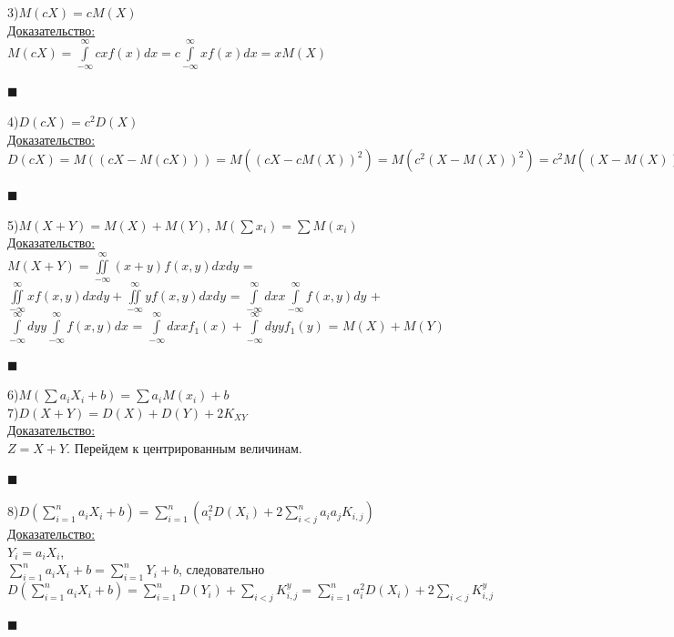 \documentclass[russian, 12pt, fleqn]{article}
\begin{document}
3)$M(cX) = cM(X)$\\
\underline{Доказательство:}\\
$M(cX) = \displaystyle{\int\limits_{-\infty} ^{\infty}} c x f(x) dx = c \displaystyle{\int \limits_{-\infty} ^{\infty}} x f(x) dx = xM(X)$\\
\begin{flushright}\(\blacksquare\)\end{flushright}
4)$D(cX) = c^2 D(X)$\\
\underline{Доказательство:}\\
$D(cX)=M((cX - M(cX))) = M((cX - c M(X))^2) = M(c^2(X-M(X))^2) = c^2M((X-M(X))^2) = c^2 D(X)$\\
\begin{flushright}\(\blacksquare\)\end{flushright}
5)$M(X+Y) = M(X) + M(Y)$,  $M(\sum x_i) = \sum M(x_i)$\\
\underline{Доказательство:}\\
$M(X + Y) =  \displaystyle{\iint \limits_{-\infty} ^{\infty}} (x+y)f(x,y) dxdy$ = $\displaystyle{\iint \limits_{-\infty} ^{\infty}} xf(x,y) dxdy + \displaystyle{\iint \limits_{-\infty} ^{\infty}} yf(x,y) dxdy$ = $\displaystyle{\int\limits_{-\infty}^{\infty} } dx x \displaystyle{\int\limits_{-\infty}^{\infty} } f(x, y) dy $ +  $\displaystyle{\int\limits_{-\infty}^{\infty} } dy y \displaystyle{\int\limits_{-\infty}^{\infty} } f(x, y) dx $ = $\displaystyle{\int\limits_{-\infty}^{\infty} } dx x f_1(x) + \displaystyle{\int\limits_{-\infty}^{\infty} } dyy f_1(y)$ = $M(X) + M(Y)$\\
\begin{flushright}\(\blacksquare\)\end{flushright}
6)$M(\sum \limits a_i X_i + b) = \sum \limits a_i M(x_i) + b$\\
7)$D(X + Y) = D(X) + D(Y) + 2 K_{XY}$\\
\underline{Доказательство:}\\
$Z=X+Y$. Перейдем к центрированным величинам.\\
\begin{flushright}\(\blacksquare\)\end{flushright}
8)$D(\displaystyle{\sum_{i = 1}^{n}}a_iX_i + b) =  \displaystyle{\sum_{i = 1}^{n}} ( a_i^2 D(X_i) + 2 \displaystyle{\sum_{i <j}^{n}}a_ia_jK_{i,j})$\\
\underline{Доказательство:}\\
$Y_i = a_i X_i$,\\
 $ \displaystyle{\sum_{i = 1}^{n}}a_iX_i + b =  \displaystyle{\sum_{i = 1}^{n}}Y_i + b$, следовательно  $D(  \displaystyle{\sum_{i = 1}^{n}} a_iX_i  +  b  ) = \displaystyle{\sum_{i = 1}^{n}} D(Y_i) + \displaystyle{\sum_{i < j}^{}} K_{i,j} ^y = \displaystyle{\sum_{i = 1}^{n}}a_i^2D(X_i) + 2 \displaystyle{\sum_{i  < j}} K_{i,j}^{y}$\\
\begin{flushright}\(\blacksquare\)\end{flushright}
\end{document}
